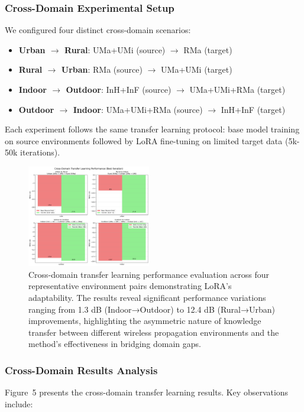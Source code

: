 \documentclass[conference]{IEEEtran}
\begin{document}
\subsubsection{Cross-Domain Experimental Setup}
We configured four distinct cross-domain scenarios:
\begin{itemize}
\item \textbf{Urban $\rightarrow$ Rural}: UMa+UMi (source) $\rightarrow$ RMa (target)
\item \textbf{Rural $\rightarrow$ Urban}: RMa (source) $\rightarrow$ UMa+UMi (target)  
\item \textbf{Indoor $\rightarrow$ Outdoor}: InH+InF (source) $\rightarrow$ UMa+UMi+RMa (target)
\item \textbf{Outdoor $\rightarrow$ Indoor}: UMa+UMi+RMa (source) $\rightarrow$ InH+InF (target)
\end{itemize}

Each experiment follows the same transfer learning protocol: base model training on source environments followed by LoRA fine-tuning on limited target data (5k-50k iterations).

\begin{figure}[t]
\centering
\includegraphics[width=0.48\textwidth]{figures/cross_domain_performance_clean.pdf}
\caption{Cross-domain transfer learning performance evaluation across four representative environment pairs demonstrating LoRA's adaptability. The results reveal significant performance variations ranging from 1.3 dB (Indoor→Outdoor) to 12.4 dB (Rural→Urban) improvements, highlighting the asymmetric nature of knowledge transfer between different wireless propagation environments and the method's effectiveness in bridging domain gaps.}
\label{fig:cross_domain}
\end{figure}

\subsubsection{Cross-Domain Results Analysis}
Figure~5 presents the cross-domain transfer learning results. Key observations include:
\end{document}
